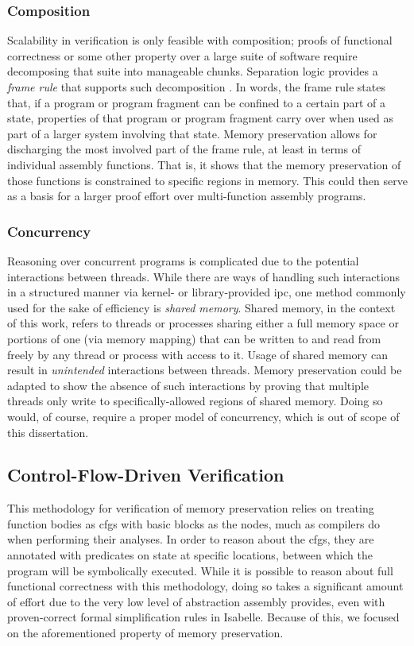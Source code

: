 \subsubsection{Composition}\label{sse:composition}
Scalability in verification is only feasible with composition;
proofs of functional correctness or some other property over a large suite of software
require decomposing that suite into manageable chunks.
Separation logic provides a \emph{frame rule} that supports such%
decomposition \autocite{o2001local,reynolds2002separation,krebbers2017essence}.
In words, the frame rule states that,
if a program or program fragment can be confined to a certain part of a state,
properties of that program or program fragment carry over
when used as part of a larger system involving that state.
Memory preservation allows for discharging the most involved part of the frame rule,
at least in terms of individual assembly functions.
That is, it shows that the memory preservation of those functions is constrained
to specific regions in memory.
This could then serve as a basis
for a larger proof effort over multi-function assembly programs.

\subsubsection{Concurrency}
Reasoning over concurrent programs is complicated
due to the potential interactions between threads.
While there are ways of handling such interactions in a structured manner
via kernel- or library-provided \ac{ipc},
one method commonly used for the sake of efficiency is \emph{shared memory}.
Shared memory, in the context of this work,
refers to threads or processes sharing either a full memory space
or portions of one (via memory mapping)
that can be written to and read from freely by any thread or process with access to it.
Usage of shared memory can result in \emph{unintended} interactions between threads.
Memory preservation could be adapted to show the absence of such interactions
by proving that multiple threads only write
to specifically-allowed regions of shared memory.
Doing so would, of course, require a proper model of concurrency,
which is out of scope of this dissertation.

\subsection{Control-Flow-Driven Verification}
This methodology for verification of memory preservation relies on treating function bodies
as \acp{cfg} with basic blocks as the nodes, much as compilers do when performing their analyses.
In order to reason about the \acp{cfg},
they are annotated with predicates on state at specific locations,
between which the program will be symbolically executed.
While it is possible to reason about full functional correctness with this methodology,
doing so takes a significant amount of effort due to the very low level of abstraction
assembly provides, even with proven-correct formal simplification rules in Isabelle.
Because of this, we focused on the aforementioned property of memory preservation.

